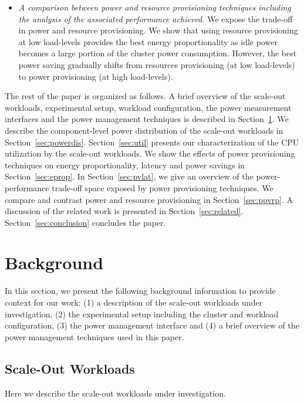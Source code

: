 \documentclass{sig-alternate}
\begin{document}
\begin{itemize}
\item \emph{A comparison between power and resource provisioning techniques 
including the analysis of the associated performance achieved.} We expose the trade-off 
in power and resource provisioning. We show that 
using resource provisioning at low load-levels provides the best energy 
proportionality as idle power becomes a large portion of the cluster 
power consumption. However, the best power 
saving gradually shifts from resources provisioning (at low load-levels) 
to power provisioning (at high load-levels). 


\end{itemize}

The rest of the paper is organized as follows. A brief overview of the 
scale-out workloads, experimental setup, workload configuration, the power measurement interfaces and 
the power management techniques is described in Section~\ref{sec:bkgnd}. We describe the component-level 
power distribution of the scale-out workloads in Section~\ref{sec:powerdis}. Section~\ref{sec:util} 
presents our characterization of the CPU utilization by the scale-out workloads. We show the effects of 
power provisioning techniques on energy proportionality, latency and power savings in Section~\ref{sec:eprop}.
In Section~\ref{sec:pvlat}, we give an overview of the power-performance trade-off space exposed by power provisioning 
techniques. We compare and contrast power and resource provisioning in Section~\ref{sec:ppvrp}. 
A discussion of the related work is presented in Section~\ref{sec:related}. 
Section~\ref{sec:conclusion} concludes the paper. 


 \section{Background}
\label{sec:bkgnd}

In this section, we present the following background information to
provide context for our work: (1) a description of the scale-out workloads under 
investigation, (2) the experimental setup including the cluster and workload 
configuration, (3) the power management interface and
(4) a brief overview of the power management techniques used in this paper.

\subsection{Scale-Out Workloads}

Here we describe the scale-out workloads under investigation. 
\end{document}
